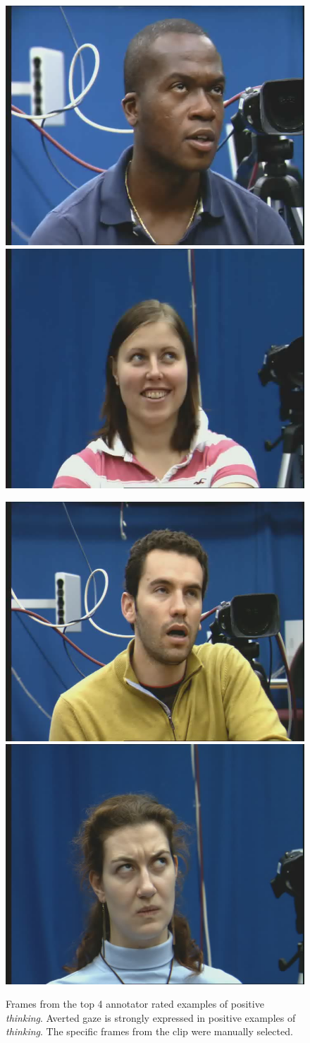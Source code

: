 \begin{figure}[tb]
\centering
\includegraphics[width = 0.49 \columnwidth]{nvcclass/pos_thinking_clip_0ikEnNwEiH.jpg}
\includegraphics[width = 0.49 \columnwidth]{nvcclass/pos_thinking_clip_1HrHJGReu2.jpg}

\includegraphics[width = 0.49 \columnwidth]{nvcclass/pos_thinking_clip_G3N4eNTLUH.jpg}
\includegraphics[width = 0.49 \columnwidth]{nvcclass/pos_thinking_clip_t8jTJw1Zrs.jpg}
\caption[Frames from the top 4 annotator rated examples of positive \textit{thinking}.]{Frames from the top 4 annotator rated examples of positive \textit{thinking}. Averted gaze is strongly expressed in positive examples of \textit{thinking}. The specific frames from the clip were manually selected.}
\label{FigurePosThinkingGbr}
\end{figure}

